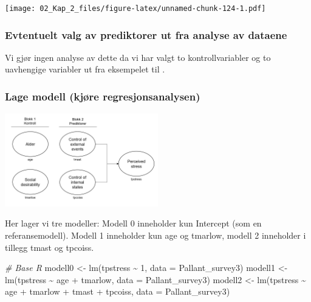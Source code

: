 \documentclass[
]{article}
\newenvironment{Shaded}{\begin{snugshade}}{\end{snugshade}}
\newcommand{\AttributeTok}[1]{\textcolor[rgb]{0.77,0.63,0.00}{#1}}
\newcommand{\CommentTok}[1]{\textcolor[rgb]{0.56,0.35,0.01}{\textit{#1}}}
\newcommand{\DecValTok}[1]{\textcolor[rgb]{0.00,0.00,0.81}{#1}}
\newcommand{\FunctionTok}[1]{\textcolor[rgb]{0.00,0.00,0.00}{#1}}
\newcommand{\NormalTok}[1]{#1}
\newcommand{\OtherTok}[1]{\textcolor[rgb]{0.56,0.35,0.01}{#1}}
\newcommand{\SpecialCharTok}[1]{\textcolor[rgb]{0.00,0.00,0.00}{#1}}
\begin{document}
\texttt{[image: 02\_Kap\_2\_files/figure-latex/unnamed-chunk-124-1.pdf]}

\hypertarget{evtentuelt-valg-av-prediktorer-ut-fra-analyse-av-dataene-1}{%
\subsubsection{Evtentuelt valg av prediktorer ut fra analyse av dataene}\label{evtentuelt-valg-av-prediktorer-ut-fra-analyse-av-dataene-1}}

Vi gjør ingen analyse av dette da vi har valgt to kontrollvariabler og to uavhengige variabler ut fra eksempelet til \citet{pallantSPSSSurvivalManual2010}.

\hypertarget{lage-modell-kjuxf8re-regresjonsanalysen-1}{%
\subsubsection{Lage modell (kjøre regresjonsanalysen)}\label{lage-modell-kjuxf8re-regresjonsanalysen-1}}

\includegraphics[width=0.5\textwidth,height=\textheight]{PallantOLShier.png}

Her lager vi tre modeller: Modell 0 inneholder kun Intercept (som en referansemodell). Modell 1 inneholder kun age og tmarlow, modell 2 inneholder i tillegg tmast og tpcoiss.

\begin{Shaded}
\begin{Highlighting}[]
\CommentTok{\# Base R}
\NormalTok{modell0 }\OtherTok{\textless{}{-}} \FunctionTok{lm}\NormalTok{(tpstress }\SpecialCharTok{\textasciitilde{}} \DecValTok{1}\NormalTok{, }\AttributeTok{data =}\NormalTok{ Pallant\_survey3)}
\NormalTok{modell1 }\OtherTok{\textless{}{-}} \FunctionTok{lm}\NormalTok{(tpstress }\SpecialCharTok{\textasciitilde{}}\NormalTok{ age }\SpecialCharTok{+}\NormalTok{ tmarlow, }\AttributeTok{data =}\NormalTok{ Pallant\_survey3)}
\NormalTok{modell2 }\OtherTok{\textless{}{-}} \FunctionTok{lm}\NormalTok{(tpstress }\SpecialCharTok{\textasciitilde{}}\NormalTok{ age }\SpecialCharTok{+}\NormalTok{ tmarlow }\SpecialCharTok{+}\NormalTok{ tmast }\SpecialCharTok{+}\NormalTok{ tpcoiss, }\AttributeTok{data =}\NormalTok{ Pallant\_survey3)}
\end{Highlighting}
\end{Shaded}
\end{document}
